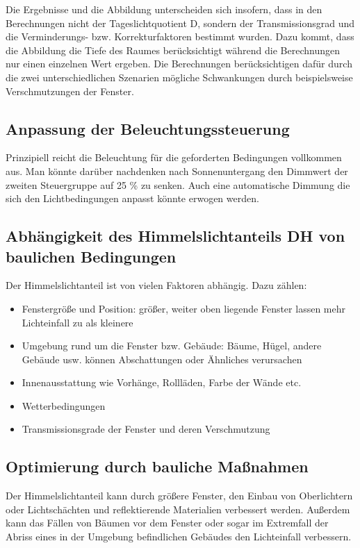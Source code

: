 Die Ergebnisse und die Abbildung unterscheiden sich insofern, dass in den Berechnungen nicht der Tageslichtquotient D, sondern der Transmissionsgrad und die Verminderungs- bzw. Korrekturfaktoren bestimmt wurden.
Dazu kommt, dass die Abbildung die Tiefe des Raumes berücksichtigt während die Berechnungen nur einen einzelnen Wert ergeben. 
Die Berechnungen berücksichtigen dafür durch die zwei unterschiedlichen Szenarien mögliche Schwankungen durch beispielsweise Verschmutzungen der Fenster.

\subsection{Anpassung der Beleuchtungssteuerung}

Prinzipiell reicht die Beleuchtung für die geforderten Bedingungen vollkommen aus.
Man könnte darüber nachdenken nach Sonnenuntergang den Dimmwert der zweiten Steuergruppe auf 25 \% zu senken. Auch eine automatische Dimmung die sich den Lichtbedingungen anpasst könnte erwogen werden.



\subsection{ Abhängigkeit des Himmelslichtanteils DH von baulichen Bedingungen}

Der Himmelslichtanteil ist von vielen Faktoren abhängig. Dazu zählen:
\begin{itemize}
\item Fenstergröße und Position: größer, weiter oben liegende Fenster lassen mehr Lichteinfall zu als kleinere
\item Umgebung rund um die Fenster bzw. Gebäude: Bäume, Hügel, andere Gebäude usw. können Abschattungen oder Ähnliches verursachen
\item Innenausstattung wie Vorhänge, Rollläden, Farbe der Wände etc. 
\item Wetterbedingungen
\item Transmissionsgrade der Fenster und deren Verschmutzung

\end{itemize}

\subsection{Optimierung durch bauliche Maßnahmen}
Der Himmelslichtanteil kann durch größere Fenster, den Einbau von Oberlichtern oder Lichtschächten und reflektierende Materialien verbessert werden. Außerdem kann das Fällen von Bäumen vor dem Fenster oder sogar im Extremfall der Abriss eines in der Umgebung befindlichen Gebäudes den Lichteinfall verbessern.

